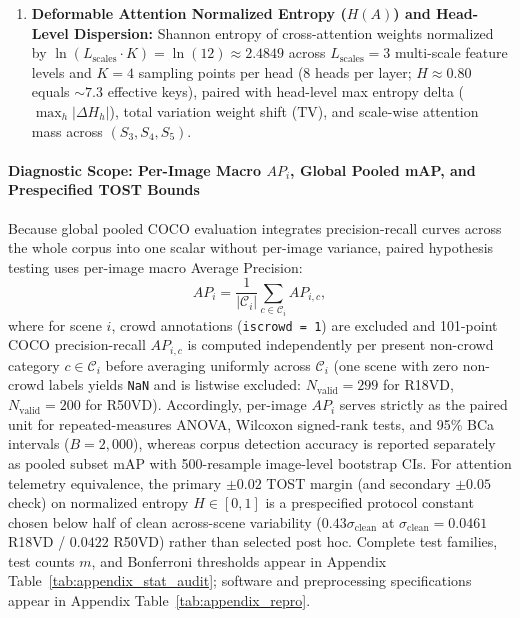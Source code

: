 \documentclass[preprint,10pt]{elsarticle}
\begin{document}
\begin{enumerate}
    \item \textbf{Deformable Attention Normalized Entropy ($H(A)$) and Head-Level Dispersion:} Shannon entropy of cross-attention weights normalized by $\ln(L_{\mathrm{scales}} \cdot K) = \ln(12) \approx 2.4849$ across $L_{\mathrm{scales}} = 3$ multi-scale feature levels and $K=4$ sampling points per head (8 heads per layer; $H \approx 0.80$ equals $\sim 7.3$ effective keys), paired with head-level max entropy delta ($\max_h |\Delta H_h|$), total variation weight shift ($\mathrm{TV}$), and scale-wise attention mass across $(S_3, S_4, S_5)$.
\end{enumerate}

\paragraph{Diagnostic Scope: Per-Image Macro $AP_i$, Global Pooled mAP, and Prespecified TOST Bounds}
Because global pooled COCO evaluation integrates precision-recall curves across the whole corpus into one scalar without per-image variance, paired hypothesis testing uses per-image macro Average Precision:
\begin{equation}
AP_i = \frac{1}{|\mathcal{C}_i|} \sum_{c \in \mathcal{C}_i} AP_{i, c},
\label{eq:per_image_ap}
\end{equation}
where for scene $i$, crowd annotations (\texttt{iscrowd = 1}) are excluded and 101-point COCO precision-recall $AP_{i,c}$ is computed independently per present non-crowd category $c \in \mathcal{C}_i$ before averaging uniformly across $\mathcal{C}_i$ (one scene with zero non-crowd labels yields \texttt{NaN} and is listwise excluded: $N_{\mathrm{valid}} = 299$ for R18VD, $N_{\mathrm{valid}} = 200$ for R50VD). Accordingly, per-image $AP_i$ serves strictly as the paired unit for repeated-measures ANOVA, Wilcoxon signed-rank tests, and 95\% BCa intervals ($B = 2,000$), whereas corpus detection accuracy is reported separately as pooled subset mAP with 500-resample image-level bootstrap CIs. For attention telemetry equivalence, the primary $\pm 0.02$ TOST margin (and secondary $\pm 0.05$ check) on normalized entropy $H \in [0, 1]$ is a prespecified protocol constant chosen below half of clean across-scene variability ($0.43 \sigma_{\mathrm{clean}}$ at $\sigma_{\mathrm{clean}} = 0.0461$ R18VD / $0.0422$ R50VD) rather than selected post hoc. Complete test families, test counts $m$, and Bonferroni thresholds appear in Appendix Table~\ref{tab:appendix_stat_audit}; software and preprocessing specifications appear in Appendix Table~\ref{tab:appendix_repro}.
\end{document}
